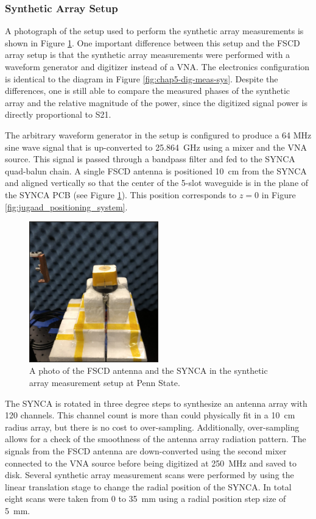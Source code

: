 \subsubsection{Synthetic Array Setup}

A photograph of the setup used to perform the synthetic array measurements is shown in Figure \ref{fig:synth_array_photo}. One important difference between this setup and the FSCD array setup is that the synthetic array measurements were performed with a waveform generator and digitizer instead of a VNA. The electronics configuration is identical to the diagram in Figure \ref{fig:chap5-dig-meas-sys}. Despite the differences, one is still able to compare the measured phases of the synthetic array and the relative magnitude of the power, since the digitized signal power is directly proportional to S21. 

The arbitrary waveform generator in the setup is configured to produce a 64 MHz sine wave signal that is up-converted to 25.864~GHz using a mixer and the VNA source. This signal is passed through a bandpass filter and fed to the SYNCA quad-balun chain. A single FSCD antenna is positioned 10~cm from the SYNCA and aligned vertically so that the center of the 5-slot waveguide is in the plane of the SYNCA PCB (see Figure \ref{fig:synth_array_photo}). This position corresponds to $z=0$ in Figure \ref{fig:jugaad_positioning_system}. 
\begin{figure}[htbp]
    \centering
    \includegraphics[width=0.5\textwidth]{figs/Chapter-5/230412_IMG_2756.png}
    \caption{A photo of the FSCD antenna and the SYNCA in the synthetic array measurement setup at Penn State.}
    \label{fig:synth_array_photo}
\end{figure}
The SYNCA is rotated in three degree steps to synthesize an antenna array with 120 channels. This channel count is more than could physically fit in a 10~cm radius array, but there is no cost to over-sampling. Additionally, over-sampling allows for a check of the smoothness of the antenna array radiation pattern. The signals from the FSCD antenna are down-converted using the second mixer connected to the VNA source before being digitized at 250~MHz and saved to disk. Several synthetic array measurement scans were performed by using the linear translation stage to change the radial position of the SYNCA. In total eight scans were taken from 0 to 35~mm using a radial position step size of 5~mm.

